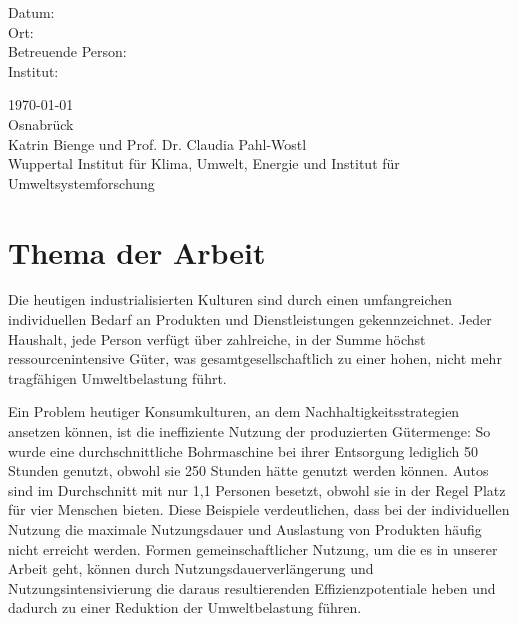 \documentclass[11pt, titlepage=true]{scrartcl} %
\newcommand{\betreuung}{Katrin Bienge und Prof. Dr. Claudia Pahl-Wostl}
\newcommand{\institut}{Wuppertal Institut für Klima, Umwelt, Energie und Institut für Umweltsystemforschung}
\newcommand{\ort}{Osnabrück}
\begin{document}
\begin{titlepage}
\begin{center}
      \vfill
{}
      \begin{minipage}[t]{0.45\textwidth}
        \begin{flushright}
          Datum:              \\[1.2ex]
          Ort:                \\[1.2ex]
          Betreuende Person:  \\[1.2ex]
          Institut:           \\[3ex]
        \end{flushright}
      \end{minipage}
      \hspace{0.01\textwidth}
      \begin{minipage}[t]{0.45\textwidth}
        \begin{flushleft}
          \today\\[1.2ex]
          \ort\\[1.2ex]
          \betreuung\\[1.2ex]
          \institut \\[3ex]
        \end{flushleft}
      \end{minipage}
  \end{center}
\end{titlepage}
\tableofcontents
\section{Thema der Arbeit}
Die heutigen industrialisierten Kulturen sind durch einen umfangreichen
individuellen Bedarf an Produkten und Dienstleistungen gekennzeichnet. Jeder
Haushalt, jede Person verfügt über zahlreiche, in der Summe höchst
ressourcenintensive Güter, was gesamtgesellschaftlich zu einer hohen, nicht mehr
tragfähigen Umweltbelastung führt.

Ein Problem heutiger Konsumkulturen, an dem Nachhaltigkeitsstrategien ansetzen
können, ist die ineffiziente Nutzung der produzierten Gütermenge: So wurde eine
durchschnittliche Bohrmaschine bei ihrer Entsorgung lediglich 50 Stunden genutzt, obwohl sie 250
Stunden hätte genutzt werden können. Autos sind im Durchschnitt mit nur 1,1 Personen besetzt, obwohl sie in der Regel Platz für vier Menschen bieten. Diese Beispiele verdeutlichen, dass bei der individuellen Nutzung die maximale Nutzungsdauer und Auslastung von Produkten häufig nicht erreicht werden. Formen gemeinschaftlicher Nutzung, um die es in unserer Arbeit geht, können durch Nutzungsdauerverlängerung und Nutzungsintensivierung die daraus resultierenden Effizienzpotentiale heben und dadurch zu einer Reduktion der Umweltbelastung führen.
\end{document}
